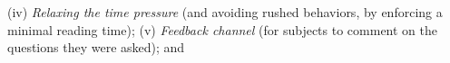 (iv)
  \emph{Relaxing the time pressure} (and avoiding rushed behaviors, by enforcing a minimal reading time);
(v) 
  \emph{Feedback channel} (for subjects to comment on the
  questions they were asked); and

